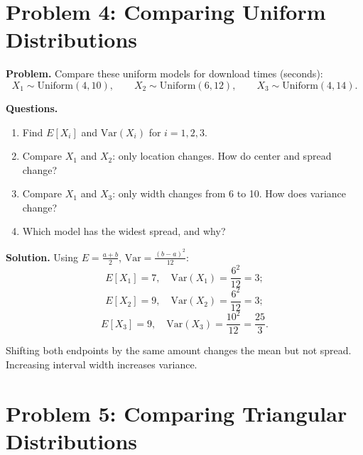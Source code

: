\section{Problem 4: Comparing Uniform Distributions}

\textbf{Problem.}
Compare these uniform models for download times (seconds):
\[
X_1\sim \text{Uniform}(4,10),\qquad X_2\sim \text{Uniform}(6,12),\qquad X_3\sim \text{Uniform}(4,14).
\]

\textbf{Questions.}
\begin{enumerate}
  \item Find \(E[X_i]\) and \(\mathrm{Var}(X_i)\) for \(i=1,2,3\).
  \item Compare \(X_1\) and \(X_2\): only location changes. How do center and spread change?
  \item Compare \(X_1\) and \(X_3\): only width changes from 6 to 10. How does variance change?
  \item Which model has the widest spread, and why?
\end{enumerate}

\textbf{Solution.}
Using \(E=\frac{a+b}{2}\), \(\mathrm{Var}=\frac{(b-a)^2}{12}\):
\[
E[X_1]=7,\quad \mathrm{Var}(X_1)=\frac{6^2}{12}=3;
\]
\[
E[X_2]=9,\quad \mathrm{Var}(X_2)=\frac{6^2}{12}=3;
\]
\[
E[X_3]=9,\quad \mathrm{Var}(X_3)=\frac{10^2}{12}=\frac{25}{3}.
\]
\begin{center}
\end{center}
Shifting both endpoints by the same amount changes the mean but not spread. Increasing interval width increases variance.

\section{Problem 5: Comparing Triangular Distributions}


